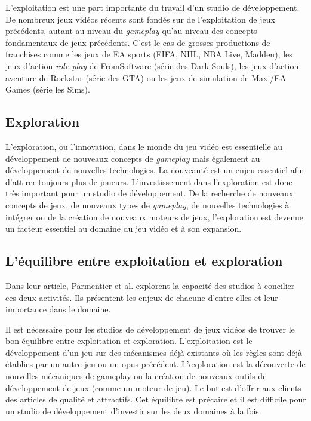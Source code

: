 L'exploitation est une part importante du travail d'un studio de développement. De nombreux jeux vidéos récents sont fondés sur de l'exploitation de jeux précédents, autant au niveau du \emph{gameplay} qu'au niveau des concepts fondamentaux de jeux précédents. C'est le cas de grosses productions de franchises comme les jeux de EA sports (FIFA, NHL, NBA Live, Madden), les jeux d'action \emph{role-play} de FromSoftware (série des Dark Souls), les jeux d'action aventure de Rockstar (série des GTA) ou les jeux de simulation de Maxi/EA Games (série les Sims). 

\subsection{Exploration}
L'exploration, ou l'innovation, dans le monde du jeu vidéo est essentielle au développement de nouveaux concepts de \emph{gameplay} mais également au développement de nouvelles technologies. La nouveauté est un enjeu essentiel afin d'attirer toujours plus de joueurs. L'investissement dans l'exploration est donc très important pour un studio de développement. De la recherche de nouveaux concepts de jeux, de nouveaux types de \emph{gameplay}, de nouvelles technologies à intégrer ou de la création de nouveaux moteurs de jeux, l'exploration est devenue un facteur essentiel au domaine du jeu vidéo et à son expansion.


\subsection{L'équilibre entre exploitation et exploration}
Dans leur article, Parmentier et al. \cite{ParmentierGuy2009Iecd} explorent la capacité des studios à concilier ces deux activités. Ils présentent les enjeux de chacune d'entre elles et leur importance dans le domaine.

Il est nécessaire pour les studios de développement de jeux vidéos de trouver le bon équilibre entre exploitation et exploration. L'exploitation est le développement d'un jeu sur des mécanismes déjà existants où les règles sont déjà établies par un autre jeu ou un opus précédent. L'exploration est la découverte de nouvelles mécaniques de gameplay ou la création de nouveaux outils de développement de jeux (comme un moteur de jeu). Le but est d'offrir aux clients des articles de qualité et attractifs. Cet équilibre est précaire et il est difficile pour un studio de développement d'investir sur les deux domaines à la fois. 



